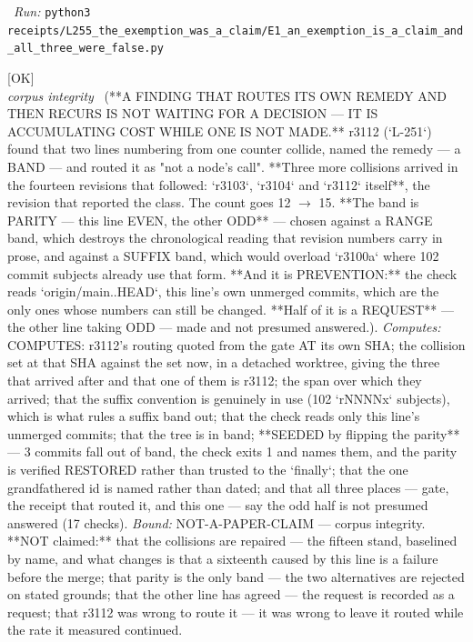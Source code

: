 \begin{description}
\ \emph{Run:} \texttt{python3 receipts/L255\_the\_exemption\_was\_a\_claim/E1\_an\_exemption\_is\_a\_claim\_and\_all\_three\_were\_false.py}
\item[\label{rcpt:B1_a_finding_that_routes_its_own_remedy_and_then_recurs_is_not_waiting}\texttt{B1\_a\_finding\_that\_routes\_its\_own\_remedy\_and\_then\_recurs\_is\_not\_waiting}]\hfill\textsf{[OK]}\\
\textit{corpus integrity} \ (**A FINDING THAT ROUTES ITS OWN REMEDY AND THEN RECURS IS NOT WAITING FOR A DECISION --- IT IS ACCUMULATING COST WHILE ONE IS NOT MADE.** r3112 (`L-251`) found that two lines numbering from one counter collide, named the remedy --- a BAND --- and routed it as "not a node's call". **Three more collisions arrived in the fourteen revisions that followed: `r3103`, `r3104` and `r3112` itself**, the revision that reported the class. The count goes 12 \ensuremath{\to} 15. **The band is PARITY --- this line EVEN, the other ODD** --- chosen against a RANGE band, which destroys the chronological reading that revision numbers carry in prose, and against a SUFFIX band, which would overload `r3100a` where 102 commit subjects already use that form. **And it is PREVENTION:** the check reads `origin/main..HEAD`, this line's own unmerged commits, which are the only ones whose numbers can still be changed. **Half of it is a REQUEST** --- the other line taking ODD --- made and not presumed answered.). 
\emph{Computes:} COMPUTES: r3112's routing quoted from the gate AT its own SHA; the collision set at that SHA against the set now, in a detached worktree, giving the three that arrived after and that one of them is r3112; the span over which they arrived; that the suffix convention is genuinely in use (102 `rNNNNx` subjects), which is what rules a suffix band out; that the check reads only this line's unmerged commits; that the tree is in band; **SEEDED by flipping the parity** --- 3 commits fall out of band, the check exits 1 and names them, and the parity is verified RESTORED rather than trusted to the `finally`; that the one grandfathered id is named rather than dated; and that all three places --- gate, the receipt that routed it, and this one --- say the odd half is not presumed answered (17 checks).
 \emph{Bound:} NOT-A-PAPER-CLAIM --- corpus integrity. **NOT claimed:** that the collisions are repaired --- the fifteen stand, baselined by name, and what changes is that a sixteenth caused by this line is a failure before the merge; that parity is the only band --- the two alternatives are rejected on stated grounds; that the other line has agreed --- the request is recorded as a request; that r3112 was wrong to route it --- it was wrong to leave it routed while the rate it measured continued.

\end{description}
